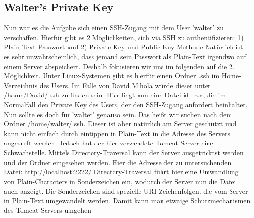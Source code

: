 \documentclass[12pt,a4paper,titlepage,oneside]{scrartcl}
\begin{document}
\subsection{Walter's Private Key}
Nun war es die Aufgabe sich einen SSH-Zugang mit dem User 'walter' zu verschaffen. Hierfür gibt es 2 Möglichkeiten, sich
via SSH zu authentifizieren: 1) Plain-Text Passwort und 2) Private-Key und Public-Key Methode
\linebreak
Natürlich ist es sehr unwahrscheinlich, dass jemand sein Passwort als Plain-Text irgendwo auf einem Server abspeichert. Deshalb
fokusieren wir uns im folgenden auf die 2. Möglichkeit.\linebreak
Unter Linux-Systemen gibt es hierfür einen Ordner .ssh im Home-Verzeichnis des Users. Im Falle von David Mihola würde
dieser unter /home/David/.ssh zu finden sein. Hier liegt nun eine Datei id\_rsa, die im Normalfall den Private Key
des Users, der den SSH-Zugang anfordert beinhaltet.\linebreak
Nun sollte es doch für 'walter' genauso sein. Das heißt wir suchen nach dem Ordner /home/walter/.ssh. Dieser ist aber
natürlich am Server geschützt und kann nicht einfach durch eintippen in Plain-Text in die Adresse des Servers
angesurft werden. Jedoch hat der hier verwendete Tomcat-Server eine Schwachstelle. Mittels Directory-Traversal kann
der Server ausgetricktst werden und der Ordner eingesehen werden. Hier die Adresse der zu untersuchenden Datei:\linebreak
http://localhost:2222/%
\linebreak
Directory-Traversal führt hier eine Umwandlung von Plain-Characters in Sonderzeichen ein, wodurch der Server nun die Datei auch
anzeigt. Die Sonderzeichen sind spezielle URI-Zeichenfolgen, die vom Server in Plain-Text umgewandelt werden. Damit kann
man etwaige Schutzmechanismen des Tomcat-Servers umgehen.
\end{document}

